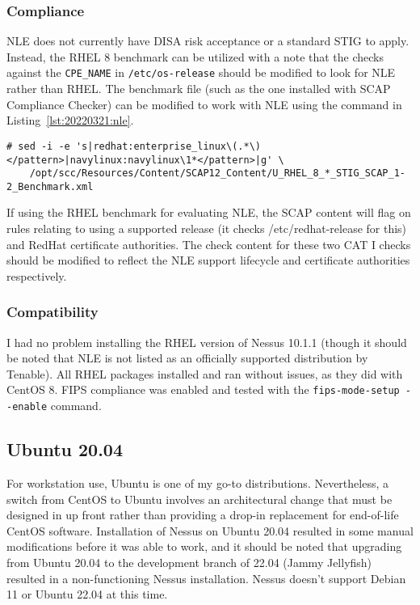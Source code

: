 \subsubsection{Compliance}
NLE does not currently have DISA risk acceptance or a standard STIG to apply. Instead, the RHEL 8 benchmark can be utilized with a note that the checks against the \texttt{CPE\_NAME} in \texttt{/etc/os-release} should be modified to look for NLE rather than RHEL. The benchmark file (such as the one installed with SCAP Compliance Checker) can be modified to work with NLE using the command in Listing~\ref{lst:20220321:nle}.

\begin{lstlisting}[caption={Modify RHEL Benchmark for Navy Linux Enterprise},captionpos=b,style=BashStyle,basicstyle=\small,label={lst:20220321:nle},literate=*{-}{-}1,breaklines=true]
# sed -i -e 's|redhat:enterprise_linux\(.*\)</pattern>|navylinux:navylinux\1*</pattern>|g' \
	/opt/scc/Resources/Content/SCAP12_Content/U_RHEL_8_*_STIG_SCAP_1-2_Benchmark.xml
\end{lstlisting}

If using the RHEL benchmark for evaluating NLE, the SCAP content will flag on rules relating to using a supported release (it checks /etc/redhat-release for this) and RedHat certificate authorities. The check content for these two CAT I checks should be modified to reflect the NLE support lifecycle and certificate authorities respectively.

\subsubsection{Compatibility}
I had no problem installing the RHEL version of Nessus 10.1.1 (though it should be noted that NLE is not listed as an officially supported distribution by Tenable). All RHEL packages installed and ran without issues, as they did with CentOS 8. FIPS compliance was enabled and tested with the \texttt{fips-mode-setup -\phantom{}-enable} command.

\subsection{Ubuntu 20.04}

For workstation use, Ubuntu is one of my go-to distributions. Nevertheless, a switch from CentOS to Ubuntu involves an architectural change that must be designed in up front rather than providing a drop-in replacement for end-of-life CentOS software. Installation of Nessus on Ubuntu 20.04 resulted in some manual modifications before it was able to work, and it should be noted that upgrading from Ubuntu 20.04 to the development branch of 22.04 (Jammy Jellyfish) resulted in a non-functioning Nessus installation. Nessus doesn't support Debian 11 or Ubuntu 22.04 at this time.

